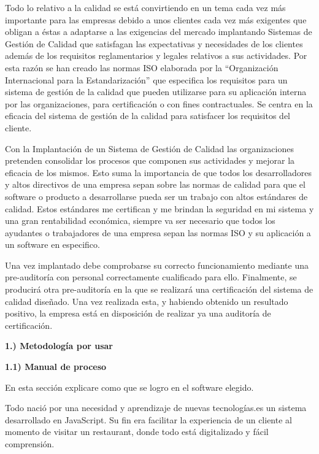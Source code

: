 \documentclass{article} %
\begin{document}
\noindent Todo lo relativo a la calidad se est\'{a} convirtiendo en un tema cada vez m\'{a}s importante para las empresas debido a unos clientes cada vez m\'{a}s exigentes que obligan a \'{e}stas a adaptarse a las exigencias del mercado implantando Sistemas de Gesti\'{o}n de Calidad que satisfagan las expectativas y necesidades de los clientes adem\'{a}s de los requisitos reglamentarios y legales relativos a sus actividades. Por esta raz\'{o}n se han creado las normas ISO elaborada por la ``Organizaci\'{o}n Internacional para la Estandarizaci\'{o}n'' que especifica los requisitos para un sistema de gesti\'{o}n de la calidad que pueden utilizarse para su aplicaci\'{o}n interna por las organizaciones, para certificaci\'{o}n o con fines contractuales. Se centra en la eficacia del sistema de gesti\'{o}n de la calidad para satisfacer los requisitos del cliente.

\noindent Con la Implantaci\'{o}n de un Sistema de Gesti\'{o}n de Calidad las organizaciones pretenden consolidar los procesos que componen sus actividades y mejorar la eficacia de los mismos. Esto suma la importancia de que todos los desarrolladores y altos directivos de una empresa sepan sobre las normas de calidad para que el software o producto a desarrollarse pueda ser un trabajo con altos est\'{a}ndares de calidad. Estos est\'{a}ndares me certifican y me brindan la seguridad en mi sistema y una gran rentabilidad econ\'{o}mica, siempre va ser necesario que todos los ayudantes o trabajadores de una empresa sepan las normas ISO y su aplicaci\'{o}n a un software en especifico.

\noindent Una vez implantado debe comprobarse su correcto funcionamiento mediante una pre-auditor\'{i}a con personal correctamente cualificado para ello. Finalmente, se producir\'{a} otra pre-auditor\'{i}a en la que se realizar\'{a} una certificaci\'{o}n del sistema de calidad dise\~{n}ado. Una vez realizada esta, y habiendo obtenido un resultado positivo, la empresa est\'{a} en disposici\'{o}n de realizar ya una auditor\'{i}a de certificaci\'{o}n.

\noindent \textbf{}

\noindent \textbf{1.) Metodolog\'{i}a por usar}

\noindent \textbf{}

\noindent \textbf{        1.1) Manual de proceso}

\noindent En esta secci\'{o}n explicare como que se logro en el software elegido.

\noindent Todo naci\'{o} por una necesidad y aprendizaje de nuevas tecnolog\'{i}as.es un sistema desarrollado en JavaScript. Su fin era facilitar la experiencia   de un cliente al momento de visitar un restaurant, donde todo est\'{a} digitalizado y f\'{a}cil comprensi\'{o}n.
\end{document}
